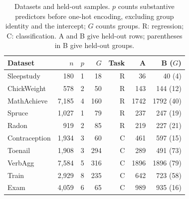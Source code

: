 \begin{table}[htbp]
\centering
\small
\caption{Datasets and held-out samples. $p$ counts substantive predictors before one-hot encoding, excluding group identity and the intercept; $G$ counts groups. R: regression; C: classification. A and B give held-out rows; parentheses in B give held-out groups.}
\label{tab:datasets}
\begin{tabular}{lrrrrrr}
\toprule
Dataset & $n$ & $p$ & $G$ & Task & A & B ($G$) \\
\midrule
Sleepstudy & 180 & 1 & 18 & R & 36 & 40 (4) \\
ChickWeight & 578 & 2 & 50 & R & 143 & 144 (12) \\
MathAchieve & 7,185 & 4 & 160 & R & 1742 & 1792 (40) \\
Spruce & 1,027 & 1 & 79 & R & 237 & 247 (19) \\
Radon & 919 & 2 & 85 & R & 219 & 227 (21) \\
Contraception & 1,934 & 3 & 60 & C & 461 & 597 (15) \\
Toenail & 1,908 & 3 & 294 & C & 289 & 491 (73) \\
VerbAgg & 7,584 & 5 & 316 & C & 1896 & 1896 (79) \\
Train & 2,929 & 8 & 235 & C & 642 & 723 (58) \\
Exam & 4,059 & 6 & 65 & C & 989 & 935 (16) \\
\bottomrule
\end{tabular}
\end{table}
